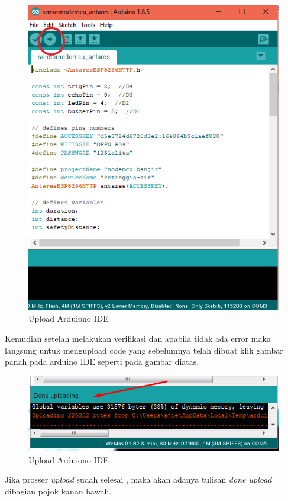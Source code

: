 \begin{enumerate}
     \begin{figure}[H]
    \centering
    \includegraphics[width=1\textwidth]{figures/upload.png}
    \caption{Upload Arduiono IDE }
    \label{print}
    \end{figure}
     \par Kemudian setelah melakukan verifikasi dan apabila tidak ada error maka langsung untuk mengupload code yang sebelumnya telah dibuat klik gambar panah pada arduino IDE seperti pada gambar diatas.
      \begin{figure}[H]
    \centering
    \includegraphics[width=1\textwidth]{figures/upload2.png}
    \caption{Upload Arduiono IDE }
    \label{print}
    \end{figure}
    \par Jika prosser \textit{upload} sudah selesai , maka akan adanya tulisan \textit{done upload} dibagian pojok kanan bawah.
    

\end{enumerate}
